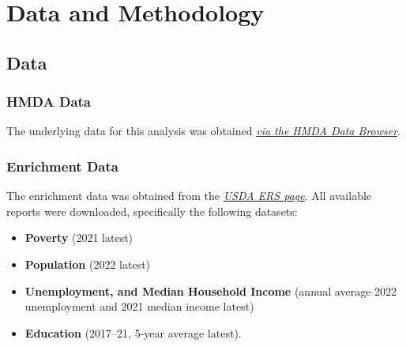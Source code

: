 \chapter{Data and Methodology}\label{ch:Data_and_Methodology}



\section{Data}\label{sec:Data}



\subsection{HMDA Data}\label{subsec:HMDA_Data}



The underlying data for this analysis was obtained \textit{\href{https://ffiec.cfpb.gov/data-browser/data/2022?category=states}{via the HMDA Data Browser}}.

\subsection{Enrichment Data}\label{subsec:Enrichment_Data}



The enrichment data was obtained from the \textit{\href{https://www.ers.usda.gov/data-products/county-level-data-sets/}{USDA ERS page}}. All available reports were downloaded, specifically the following datasets:

\begin{itemize}
    \item \textbf{Poverty} (2021 latest)
    \item \textbf{Population} (2022 latest)
    \item \textbf{Unemployment, and Median Household Income} (annual average 2022 unemployment and 2021 median income latest)
    \item \textbf{Education} (2017–21, 5-year average latest).
\end{itemize}

